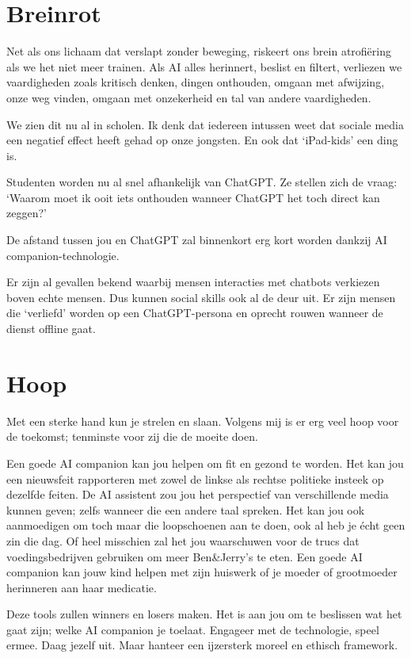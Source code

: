\documentclass[twocolumn]{article}
\begin{document}
\section*{Breinrot}

Net als ons lichaam dat verslapt zonder beweging, riskeert ons brein atrofiëring als we het niet meer trainen.
Als AI alles herinnert, beslist en filtert, verliezen we vaardigheden zoals kritisch denken, dingen onthouden, omgaan met afwijzing, onze weg vinden, omgaan met onzekerheid en tal van andere vaardigheden.

We zien dit nu al in scholen.
Ik denk dat iedereen intussen weet dat sociale media een negatief effect heeft gehad op onze jongsten.
En ook dat `iPad-kids' een ding is.

Studenten worden nu al snel afhankelijk van ChatGPT.
Ze stellen zich de vraag: `Waarom moet ik ooit iets onthouden wanneer ChatGPT het toch direct kan zeggen?'

De afstand tussen jou en ChatGPT zal binnenkort erg kort worden dankzij AI companion-technologie.

Er zijn al gevallen bekend waarbij mensen interacties met chatbots verkiezen boven echte mensen.
Dus kunnen social skills ook al de deur uit.
Er zijn mensen die `verliefd' worden op een ChatGPT-persona en oprecht rouwen wanneer de dienst offline gaat.

\section*{Hoop}

Met een sterke hand kun je strelen en slaan.
Volgens mij is er erg veel hoop voor de toekomst; tenminste voor zij die de moeite doen.

Een goede AI companion kan jou helpen om fit en gezond te worden.
Het kan jou een nieuwsfeit rapporteren met zowel de linkse als rechtse politieke insteek op dezelfde feiten.
De AI assistent zou jou het perspectief van verschillende media kunnen geven; zelfs wanneer die een andere taal spreken.
Het kan jou ook aanmoedigen om toch maar die loopschoenen aan te doen, ook al heb je écht geen zin die dag.
Of heel misschien zal het jou waarschuwen voor de trucs dat voedingsbedrijven gebruiken om meer Ben\&Jerry's te eten.
Een goede AI companion kan jouw kind helpen met zijn huiswerk of je moeder of grootmoeder herinneren aan haar medicatie.

Deze tools zullen winners en losers maken.
Het is aan jou om te beslissen wat het gaat zijn; welke AI companion je toelaat.
Engageer met de technologie, speel ermee.
Daag jezelf uit.
Maar hanteer een ijzersterk moreel en ethisch framework.
\end{document}

